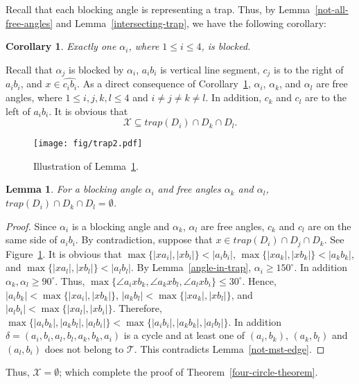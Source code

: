 \documentclass[11pt,a4paper]{article}
\newtheorem{lemma}{Lemma}
\newtheorem{corollary}{Corollary}
\begin{document}
Recall that each blocking angle is representing a trap. Thus, by Lemma~\ref{not-all-free-angles} and Lemma~\ref{intersecting-trap}, we have the following corollary:

\begin{corollary}
\label{one-blocked-angle}
Exactly one $\alpha_i$, where $1\le i\le 4$, is blocked.
\end{corollary}
Recall that $\alpha_j$ is blocked by $\alpha_i$, $a_ib_i$ is vertical line segment, $c_j$ is to the right of $a_ib_i$, and $x\in\widehat{c_ib_i}$. As a direct consequence of Corollary~\ref{one-blocked-angle}, $\alpha_i$, $\alpha_k$, and $\alpha_l$ are free angles, where $1\le\allowbreak i,j,\allowbreak k,\allowbreak l\le\allowbreak 4$ and $i\neq j\neq k\neq l$. In addition, $c_k$ and $c_l$ are to the left of $a_ib_i$. It is obvious that $$\mathcal{X}\subseteq trap(D_i)\cap D_k \cap D_l.$$

\begin{figure}[htb]
  \centering
  \texttt{[image: fig/trap2.pdf]}
 \caption{Illustration of Lemma~\ref{intersecting-trap2}.}
  \label{trap2-fig}
\end{figure}

\begin{lemma}
\label{intersecting-trap2}
For a blocking angle $\alpha_i$ and free angles $\alpha_k$ and $\alpha_l$, $trap(D_i)\allowbreak\cap D_k \allowbreak\cap D_l=\emptyset$. 
\end{lemma}
\begin{proof}
Since $\alpha_i$ is a blocking angle and $\alpha_k$, $\alpha_l$ are free angles, $c_k$ and $c_l$ are on the same side of $a_ib_i$.
 By contradiction, suppose that $x\in trap(D_i)\cap D_j \cap D_k$. See Figure~\ref{trap2-fig}. It is obvious that $\max\{|xa_i|, |xb_i|\}< |a_ib_i|$, $\max\{|xa_k|, |xb_k|\}< |a_kb_k|$, and $\max\{|xa_l|, |xb_l|\}<|a_lb_l|$. By Lemma~\ref{angle-in-trap}, $\alpha_i \ge 150^\circ$. In addition $\alpha_k, \alpha_l \allowbreak\ge\allowbreak 90^\circ$. Thus, $\max\{\angle a_ixb_k, \angle a_kxb_l, \angle a_lxb_i\}\allowbreak\le\allowbreak 30^\circ$. Hence, $|a_ib_k|\allowbreak<\allowbreak\max\{|xa_i|,|xb_k|\}$, $|a_kb_l|<\max\{|xa_k|,|xb_l|\}$, and $|a_lb_i|<\max\{|xa_l|,\allowbreak|xb_i|\}$. Therefore, $\max\{|a_ib_k|,|a_kb_l|, |a_lb_i|\}\allowbreak<\max\allowbreak\{|a_ib_i|,\allowbreak|a_kb_k|,|a_lb_l|\}$. In addition $\delta=(a_i,\allowbreak b_i,a_l,\allowbreak b_l,a_k,\allowbreak b_k,a_i)$ is a cycle and at least one of $(a_i,b_k)$, $(a_k,b_l)$ and $(a_l,b_i)$ does not belong to $\mathcal{T}$. This contradicts Lemma~\ref{not-mst-edge}. 
\end{proof}
Thus, $\mathcal{X}=\emptyset$; which complete the proof of Theorem~\ref{four-circle-theorem}.
\end{document}
